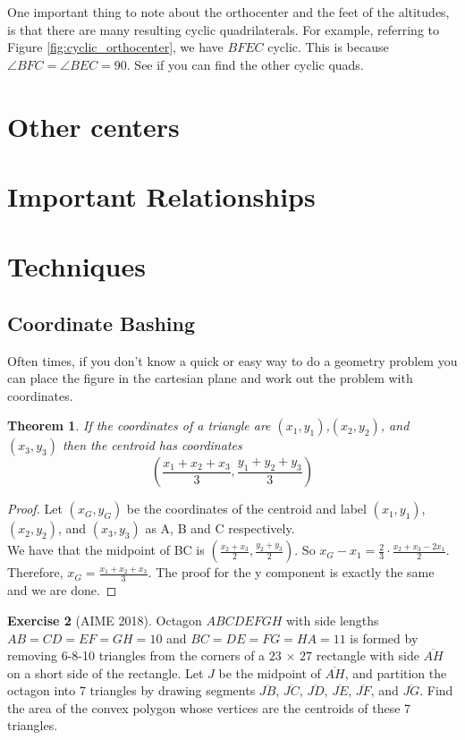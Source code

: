 \documentclass[letterpaper]{article}
\theoremstyle{plain}
\newtheorem{thm}{Theorem}[section]
\theoremstyle{definition}
\newtheorem{exercise}[thm]{Exercise}
\theoremstyle{remark}
\begin{document}
One important thing to note about the orthocenter and the feet of the altitudes, is that there are many resulting cyclic quadrilaterals.
For example, referring to Figure \ref{fig:cyclic_orthocenter}, we have $BFEC$ cyclic. This is because $\angle BFC = \angle BEC = 90$.
See if you can find the other cyclic quads.


\section{Other centers}
\section{Important Relationships}
\section{Techniques}
    \subsection{Coordinate Bashing}
    Often times, if you don't know a quick or easy way to do a geometry problem you can place the figure in the cartesian plane and work out the problem with coordinates.
    \begin{mdframed}
        \begin{thm}
            If the coordinates of a triangle are $(x_1,y_1)$,$(x_2,y_2)$, and $(x_3,y_3)$ then the centroid has coordinates $$\left(\frac{x_1+x_2+x_3}{3},\frac{y_1+y_2+y_3}{3}\right)$$
        \end{thm}
        
    \end{mdframed}
    \begin{proof}
        Let $(x_G,y_G)$ be the coordinates of the centroid and label $(x_1,y_1)$,$(x_2,y_2)$, and $(x_3,y_3)$ as A, B and C respectively.
        \\We have that the midpoint of BC is $\left(\frac{x_2+x_3}{2},\frac{y_2+y_3}{2}\right)$. So $x_G-x_1=\frac{2}{3}\cdot\frac{x_2+x_3-2x_1}{2}$.
        Therefore, $x_G = \frac{x_1+x_2+x_3}{3}$. The proof for the y component is exactly the same and we are done.
         
    \end{proof}
    \begin{exercise}[AIME 2018]
        Octagon $ABCDEFGH$ with side lengths $AB = CD = EF = GH = 10$ and $BC = DE = FG = HA = 11$ is formed by removing 6-8-10 triangles from the corners of a $23$ $\times$ $27$ rectangle with side $\overline{AH}$ on a short side of the rectangle. Let $J$ be the midpoint of $\overline{AH}$, and partition the octagon into 7 triangles by drawing segments $\overline{JB}$, $\overline{JC}$, $\overline{JD}$, $\overline{JE}$, $\overline{JF}$, and $\overline{JG}$. Find the area of the convex polygon whose vertices are the centroids of these 7 triangles.
    \end{exercise}
\end{document}
